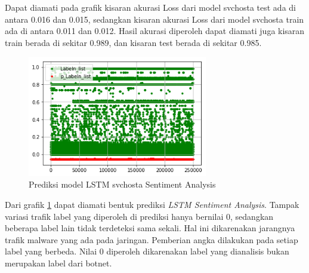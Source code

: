 \documentclass[./skripsi.tex]{subfiles}
\begin{document}
\par Dapat diamati pada grafik kisaran akurasi Loss dari model svchosta test ada di antara 0.016 dan 0.015, sedangkan kisaran akurasi Loss dari model svchosta train ada di antara 0.011 dan 0.012. Hasil akurasi diperoleh dapat diamati juga kisaran train berada di sekitar 0.989, dan kisaran test berada di sekitar 0.985.

\begin{figure}%
    \centering
    \includegraphics[width=0.7\textwidth]{public/assets/img/lstms_svchosta_pred.png}
    \caption{Prediksi model LSTM svchosta Sentiment Analysis}
    \label{fig:lstms_svchosta_pred}
\end{figure}

\par Dari grafik \ref{fig:lstms_svchosta_pred} dapat diamati bentuk prediksi \textit{LSTM Sentiment Analysis}. Tampak variasi trafik label yang diperoleh di prediksi hanya bernilai 0, sedangkan beberapa label lain tidak terdeteksi sama sekali. Hal ini dikarenakan jarangnya trafik malware yang ada pada jaringan. Pemberian angka dilakukan pada setiap label yang berbeda. Nilai 0 diperoleh dikarenakan label yang dianalisis bukan merupakan label dari botnet.
\end{document}
